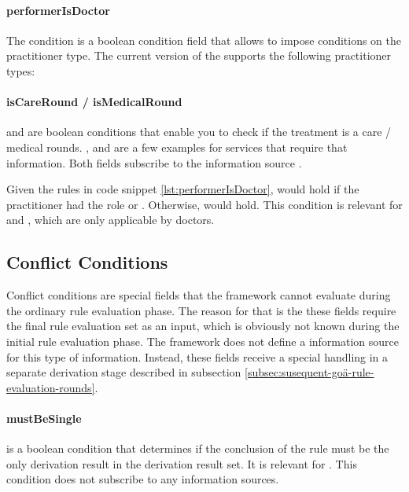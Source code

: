 \paragraph{performerIsDoctor}
The  condition is a boolean condition field that allows to impose conditions on the practitioner type.
The current version of the \AVS supports the following practitioner types:

\paragraph{isCareRound / isMedicalRound}
 and  are boolean conditions that enable you to check if the treatment is a care / medical rounds.
,  and  are a few examples for services that require that information.
Both fields subscribe to the information source .




Given the rules in code snippet \ref{lst:performerIsDoctor},  would hold if the practitioner had the role 
or .
Otherwise,  would hold.
This condition is relevant for  and , which are only applicable by doctors.



\subsection{Conflict Conditions}\label{subsec:conflict-conditions}
Conflict conditions are special fields that the framework cannot evaluate during the ordinary rule evaluation phase.
The reason for that is the these fields require the final rule evaluation set as an input, which is obviously not known during the initial rule evaluation phase.
The framework does not define a information source for this type of information.
Instead, these fields receive a special handling in a separate derivation stage described in subsection \ref{subsec:susequent-goä-rule-evaluation-rounds}.

\paragraph{mustBeSingle}
 is a boolean condition that determines if the conclusion of the rule must be the only derivation result in the derivation result set.
It is relevant for .
This condition does not subscribe to any information sources.

